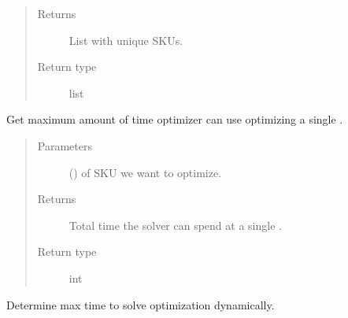 \documentclass[letterpaper,10pt,english]{sphinxmanual}
\begin{document}
\begin{fulllineitems}
\begin{fulllineitems}
\begin{quote}
\begin{description}
\item[{Returns}] \leavevmode
List with unique SKUs.

\item[{Return type}] \leavevmode
list

\end{description}\end{quote}

\end{fulllineitems}


\begin{fulllineitems}
\label{\detokenize{source/optimization.model:optimization.model.main.ModelOptimization._get_solver_time}}
Get maximum amount of time optimizer can use optimizing a single .
\begin{quote}\begin{description}
\item[{Parameters}] \leavevmode
{} () \textendash{}  of SKU we want to optimize.

\item[{Returns}] \leavevmode
Total time the solver can spend at a single .

\item[{Return type}] \leavevmode
int

\end{description}\end{quote}

\end{fulllineitems}


\begin{fulllineitems}
\label{\detokenize{source/optimization.model:optimization.model.main.ModelOptimization.dynamic_max_solver_time}}
Determine max time to solve optimization dynamically.


\end{fulllineitems}
\end{fulllineitems}
\end{document}
